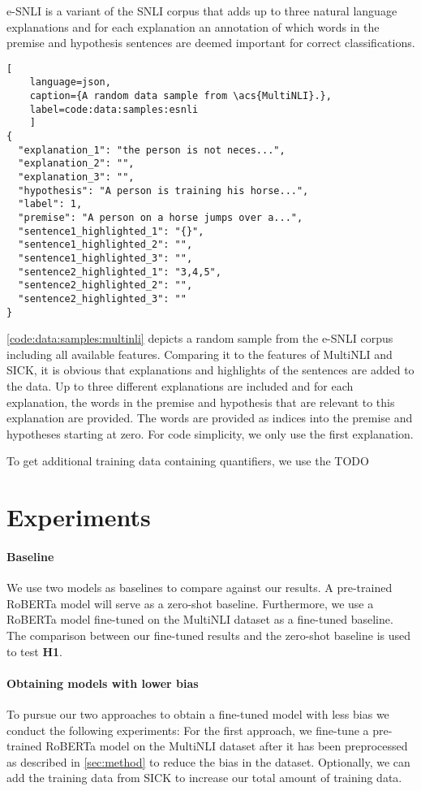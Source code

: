 \Acf{e-SNLI} \cite{esnli} is a variant of the \acs{SNLI} \cite{snli} corpus that adds up to three natural language explanations and for each explanation an annotation of which words in the premise and hypothesis sentences are deemed important for correct classifications.

\begin{lstlisting}[
    language=json,
    caption={A random data sample from \acs{MultiNLI}.},
    label=code:data:samples:esnli
    ]
{
  "explanation_1": "the person is not neces...",
  "explanation_2": "",
  "explanation_3": "",
  "hypothesis": "A person is training his horse...",
  "label": 1,
  "premise": "A person on a horse jumps over a...",
  "sentence1_highlighted_1": "{}",
  "sentence1_highlighted_2": "",
  "sentence1_highlighted_3": "",
  "sentence2_highlighted_1": "3,4,5",
  "sentence2_highlighted_2": "",
  "sentence2_highlighted_3": ""
}
\end{lstlisting}

\autoref{code:data:samples:multinli} depicts a random sample from the \acs{e-SNLI} corpus including all available features. Comparing it to the features of \acs{MultiNLI} and \acs{SICK}, it is obvious that explanations and highlights of the sentences are added to the data. Up to three different explanations are included and for each explanation, the words in the premise and hypothesis that are relevant to this explanation are provided. The words are provided as indices into the premise and hypotheses starting at zero. For code simplicity, we only use the first explanation.

To get additional training data containing quantifiers, we use the TODO

\section{Experiments}

\paragraph{Baseline} We use two models as baselines to compare against our results. A pre-trained \ac{RoBERTa} model will serve as a zero-shot baseline. Furthermore, we use a \ac{RoBERTa} model fine-tuned on the \ac{MultiNLI} dataset as a fine-tuned baseline. The comparison between our fine-tuned results and the zero-shot baseline is used to test \textbf{H1}.

\paragraph{Obtaining models with lower bias} To pursue our two approaches to obtain a fine-tuned model with less bias we conduct the following experiments: For the first approach, we fine-tune a pre-trained \ac{RoBERTa} model on the \ac{MultiNLI} dataset after it has been preprocessed as described in \autoref{sec:method} to reduce the bias in the dataset. Optionally, we can add the training data from \ac{SICK} to increase our total amount of training data.


